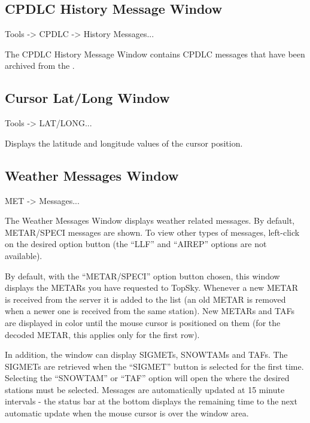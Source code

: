 \documentclass[a4paper,oneside,11pt]{memoir}
\begin{document}
\subsection{CPDLC History Message Window}
\label{win:dlhmw}

 Tools -> CPDLC -> History Messages...

\bigskip


The CPDLC History Message Window contains CPDLC messages that have been archived from the .

\subsection{Cursor Lat/Long Window}
\label{win:latlon}

 Tools -> LAT/LONG...

\bigskip


Displays the latitude and longitude values of the cursor position.

\subsection{Weather Messages Window}
\label{win:wxmw}

 MET -> Messages...

\bigskip


The Weather Messages Window displays weather related messages. By default, METAR/SPECI messages are shown. To view other types of messages, left-click on the desired option button (the “LLF” and “AIREP” options are not available).

\bigskip

By default, with the “METAR/SPECI” option button chosen, this window displays the METARs you have requested to TopSky. Whenever a new METAR is received from the server it is added to the list (an old METAR is removed when a newer one is received from the same station). New METARs and TAFs are displayed in  color until the mouse cursor is positioned on them (for the decoded METAR, this applies only for the first row).

\bigskip

In addition, the window can display SIGMETs, SNOWTAMs and TAFs. The SIGMETs are retrieved when the “SIGMET” button is selected for the first time. Selecting the “SNOWTAM” or “TAF” option will open the  where the desired stations must be selected. Messages are automatically updated at 15 minute intervals - the status bar at the bottom displays the remaining time to the next automatic update when the mouse cursor is over the window area.
\end{document}

